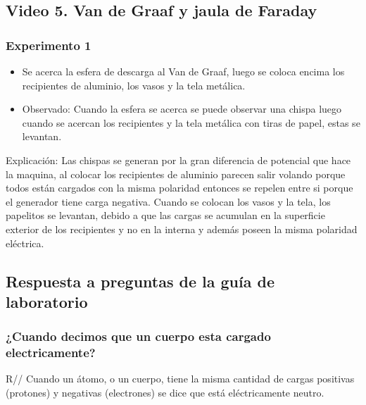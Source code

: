 \documentclass[letterpaper, 12pt]{report}
\begin{document}
\subsection{Video 5. Van de Graaf y jaula de Faraday}

\subsubsection{Experimento 1}

\begin{itemize}
	\item Se acerca la esfera de descarga al Van de Graaf, luego se
	      coloca encima los recipientes de aluminio, los vasos y la
	      tela metálica.

	\item Observado: Cuando la esfera se acerca se puede observar una chispa
	      luego cuando se acercan los recipientes y la tela metálica con tiras
	      de papel, estas se levantan.
\end{itemize}

Explicación: Las chispas se generan por la gran diferencia de potencial que
hace la maquina, al colocar los recipientes de aluminio parecen salir volando
porque todos están cargados con la misma polaridad entonces se repelen entre
si porque el generador tiene carga negativa. Cuando se colocan los vasos y
la tela, los papelitos se levantan, debido a que las cargas se acumulan en
la superficie exterior de los recipientes y no en la interna y además poseen
la misma polaridad eléctrica.~\cite{LeyCargasElectricas}

\subsection{Respuesta a preguntas de la guía de laboratorio}

\subsubsection{¿Cuando decimos que un cuerpo esta cargado electricamente?}

R// Cuando un átomo, o un cuerpo, tiene la misma cantidad de cargas
positivas (protones) y negativas (electrones) se dice que está eléctricamente
neutro.

\vspace{.5cm}
\end{document}
